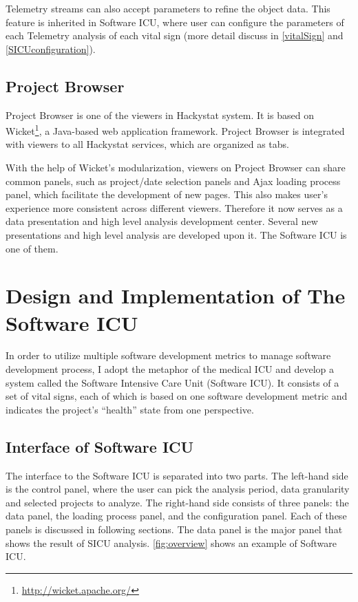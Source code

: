 Telemetry streams can also accept parameters to refine the object data. This feature is inherited in Software ICU, where user can configure the parameters of each Telemetry analysis of each vital sign (more detail discuss in \autoref{vitalSign} and \autoref{SICUconfiguration}).

\section {Project Browser}
Project Browser is one of the viewers in Hackystat system. It is based on Wicket\footnote{\url{http://wicket.apache.org/}}, a Java-based web application framework. Project Browser is integrated with viewers to all Hackystat services, which are organized as tabs. 

With the help of Wicket's modularization, viewers on Project Browser can share common panels, such as project/date selection panels and Ajax loading process panel, which facilitate the development of new pages. This also makes user's experience more consistent across different viewers. Therefore it now serves as a data presentation and high level analysis development center. Several new presentations and high level analysis are developed upon it. The Software ICU is one of them.




\chapter{Design and Implementation of The Software ICU}
In order to utilize multiple software development metrics to manage software development process, I adopt the metaphor of the medical ICU and develop a system called the Software Intensive Care Unit (Software ICU). It consists of a set of vital signs, each of which is based on one software development metric and indicates the project's ``health'' state from one perspective.

\section{Interface of Software ICU}

The interface to the Software ICU is separated into two parts. The left-hand side is the control panel, where the user can pick the analysis period, data granularity and selected projects to analyze. The right-hand side consists of three panels: the data panel, the loading process panel, and the configuration panel. Each of these panels is discussed in following sections. The data panel is the major panel that shows the result of SICU analysis. \autoref{fig:overview} shows an example of Software ICU.

